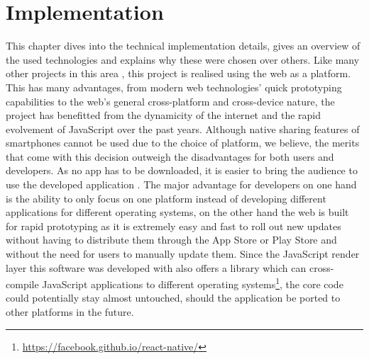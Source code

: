 \chapter{Implementation}
\label{cha:implementation}



This chapter dives into the technical implementation details, gives an overview of the used technologies and explains why these were chosen over others. Like many other projects in this area \cite{Bry:Backstage, Cheng:TreebasedOnlinePresentations, Esponda:ElectronicVotingOnTheFly, Inoue:RealTimeQuestionnaire, Teevan:MobileFeedbackDuringPresentation, Triglianos:InteractiveWebPresentationsImpress}, this project is realised using the web as a platform.
This has many advantages, from modern web technologies' quick prototyping capabilities to the web's general cross-platform and cross-device nature, the project has benefitted from the dynamicity of the internet and the rapid evolvement of JavaScript over the past years.
Although native sharing features of smartphones cannot be used due to the choice of platform, we believe, the merits that come with this decision outweigh the disadvantages for both users and developers. As no app has to be downloaded, it is easier to bring the audience to use the developed application \cite{Triglianos:InteractiveWebPresentationsImpress}. The major advantage for developers on one hand is the ability to only focus on one platform instead of developing different applications for different operating systems, on the other hand the web is built for rapid prototyping as it is extremely easy and fast to roll out new updates without having to distribute them through the App Store or Play Store and without the need for users to manually update them. Since the JavaScript render layer this software was developed with also offers a library which can cross-compile JavaScript applications to different operating systems\footnote{\url{https://facebook.github.io/react-native/}}, the core code could potentially stay almost untouched, should the application be ported to other platforms in the future.

